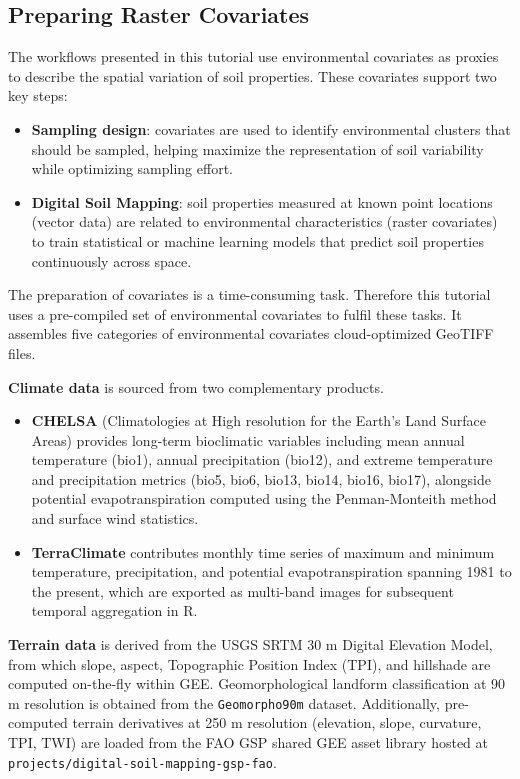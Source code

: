 \documentclass[
  10pt,
  b5paper,
  oneside]{book}
\begin{document}
\subsection{Preparing Raster Covariates}\label{preparing-raster-covariates}

The workflows presented in this tutorial use environmental covariates as proxies to describe the spatial variation of soil properties. These covariates support two key steps:

\begin{itemize}
\item
  \textbf{Sampling design}: covariates are used to identify environmental clusters that should be sampled, helping maximize the representation of soil variability while optimizing sampling effort.
\item
  \textbf{Digital Soil Mapping}: soil properties measured at known point locations (vector data) are related to environmental characteristics (raster covariates) to train statistical or machine learning models that predict soil properties continuously across space.
\end{itemize}

The preparation of covariates is a time-consuming task. Therefore this tutorial uses a pre-compiled set of environmental covariates to fulfil these tasks. It assembles five categories of environmental covariates cloud-optimized GeoTIFF files.

\textbf{Climate data} is sourced from two complementary products.

\begin{itemize}
\item
  \textbf{CHELSA} (Climatologies at High resolution for the Earth's Land Surface Areas) provides long-term bioclimatic variables including mean annual temperature (bio1), annual precipitation (bio12), and extreme temperature and precipitation metrics (bio5, bio6, bio13, bio14, bio16, bio17), alongside potential evapotranspiration computed using the Penman-Monteith method and surface wind statistics.
\item
  \textbf{TerraClimate} contributes monthly time series of maximum and minimum temperature, precipitation, and potential evapotranspiration spanning 1981 to the present, which are exported as multi-band images for subsequent temporal aggregation in R.
\end{itemize}

\textbf{Terrain data} is derived from the USGS SRTM 30 m Digital Elevation Model, from which slope, aspect, Topographic Position Index (TPI), and hillshade are computed on-the-fly within GEE. Geomorphological landform classification at 90 m resolution is obtained from the \texttt{Geomorpho90m} dataset. Additionally, pre-computed terrain derivatives at 250 m resolution (elevation, slope, curvature, TPI, TWI) are loaded from the FAO GSP shared GEE asset library hosted at \texttt{projects/digital-soil-mapping-gsp-fao}.
\end{document}
